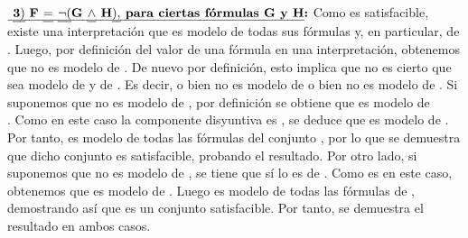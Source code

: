 \begin{isabellebody}
\begin{isamarkuptext}
\begin{demostracion}
      $\textbf{\isa{{\isasymthree}{\isacharparenright}\ F\ {\isacharequal}\ {\isasymnot}{\isacharparenleft}G\ {\isasymand}\ H{\isacharparenright}{\isacharcomma}\ para\ ciertas\ fórmulas\ G\ y\ H}:}$ Como  es satisfacible,
      existe una interpretación \isa{{\isasymA}} que es modelo de todas sus fórmulas y, en particular, de .
      Luego, por definición del valor de una fórmula en una interpretación, obtenemos que \isa{{\isasymA}} no
      es modelo de . De nuevo por definición, esto implica que no es cierto que \isa{{\isasymA}} sea 
      modelo de  y de . Es decir, o bien \isa{{\isasymA}} no es modelo de  o bien \isa{{\isasymA}} no es modelo de
      . Si suponemos que no es modelo de , por definición se obtiene que \isa{{\isasymA}} es modelo de\\
      . Como en este caso la componente disyuntiva  es , se deduce que \isa{{\isasymA}} es modelo
      de . Por tanto, \isa{{\isasymA}} es modelo de todas las fórmulas del conjunto , por lo que
      se demuestra que dicho conjunto es satisfacible, probando el resultado. Por otro lado, si
      suponemos que \isa{{\isasymA}} no es modelo de , se tiene que sí lo es de . Como  es 
      en este caso, obtenemos que \isa{{\isasymA}} es modelo de . Luego \isa{{\isasymA}} es modelo de todas las fórmulas
      de , demostrando así que es un conjunto satisfacible. Por tanto, se demuestra
      el resultado en ambos casos.


\end{demostracion}
\end{isamarkuptext}
\end{isabellebody}
